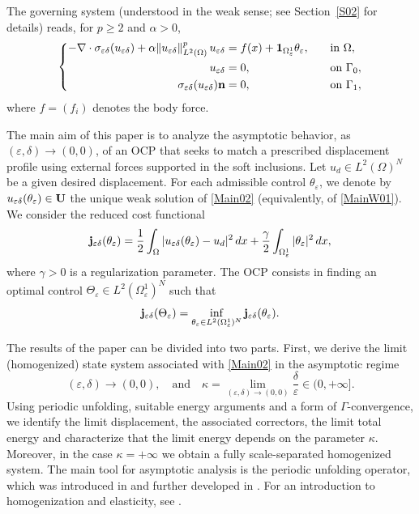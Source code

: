 \documentclass[11pt,a4paper]{article}
\numberwithin{equation}{section}
\def\1{{\bf 1}}
\def\O{\Omega}
\def\d{\delta}
\def\e{\varepsilon}
\def\ed{{\varepsilon\delta}}
\def\Gj{{\bf j}}
\def\Gn{{\bf n}}
\def\GU{{\bf U}}
\begin{document}
The governing system (understood in the weak sense; see Section~\ref{S02} for details) reads, for $p\ge 2$ and $\alpha>0$,
\begin{equation}\label{Main02}
	\left\{\begin{aligned}
		-\nabla \cdot \sigma_\ed(u_\ed)+\alpha\|u_\ed\|^p_{ L^2(\O)}\, u_\ed&=f(x)+\1_{\O^1_\e}\theta_\e,\quad &&\text{in }\O,\\
		u_\ed&=0,\quad &&\text{on }\Gamma_0,\\
		\sigma_\ed(u_\ed)\Gn&=0,\quad&&\text{on }\Gamma_1,
	\end{aligned}\right.
\end{equation}
where $f=(f_i)$ denotes the body force.

The main aim of this paper is to analyze the asymptotic behavior, as $(\e,\d)\to(0,0)$, of an OCP that seeks to match a prescribed displacement profile using external forces supported in the soft inclusions. Let $u_d\in L^2(\O)^N$ be a given desired displacement. For each admissible control $\theta_\e$, we denote by $u_\ed(\theta_\e)\in\GU$ the unique weak solution of \eqref{Main02} (equivalently, of \eqref{MainW01}). We consider the reduced cost functional
\begin{equation*}
	\Gj_{\ed}(\theta_\e)
	=\frac12\int_\O |u_\ed(\theta_\e)-u_d|^2\,dx
	+\frac{\gamma}{2}\int_{\O^1_\e}|\theta_\e|^2\,dx,
\end{equation*}
where $\gamma>0$ is a regularization parameter. The OCP consists in finding an optimal control $\Theta_\e\in L^2(\O^1_\e)^N$ such that
\begin{equation*}
	\Gj_{\ed}(\Theta_\e)=\inf_{\theta_\e\in L^2(\O^1_\e)^N}\Gj_{\ed}(\theta_\e).
\end{equation*}

The results of the paper can be divided into two parts. First, we derive the limit (homogenized) state system associated with \eqref{Main02} in the asymptotic regime
\begin{equation}\label{R1}
	(\e,\d)\to(0,0),\quad \text{and}\quad \kappa=\lim_{(\e,\d)\to(0,0)}\frac{\d}{\e}\in(0,+\infty].
\end{equation}
Using periodic unfolding, suitable energy arguments and a form of $\Gamma$-convergence, we identify the limit displacement, the associated correctors, the limit total energy and characterize that the limit energy depends on the parameter $\kappa$. Moreover, in the case $\kappa=+\infty$ we obtain a fully scale-separated homogenized system. The main tool for asymptotic analysis is the periodic unfolding operator, which was introduced in \cite{CDG2} and further developed in \cite{CDG1}. For an introduction to homogenization and elasticity, see \cite{Olenik,Donato,twoscale1,twoscale2,CDG}.
 
\end{document}
